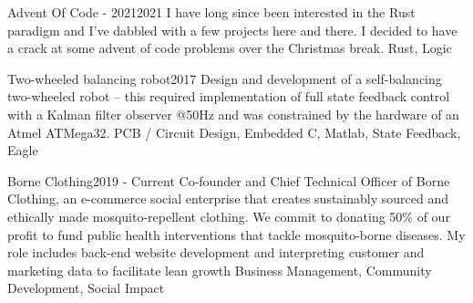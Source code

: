 %
%
%


\begin{projects}
	\project
	{Advent Of Code - 2021}{2021}
	{}
	{I have long since been interested in the Rust paradigm and I've dabbled with a few projects here and there. I decided to have a crack at some advent of code problems over the Christmas break.}
	{Rust, Logic}

	\project
	{Two-wheeled balancing robot}{2017}
	{}
	{Design and development of a self-balancing two-wheeled robot – this required
	implementation of full state feedback control with a Kalman filter observer @50Hz and was constrained by the
	hardware of an Atmel ATMega32.}
	{PCB / Circuit Design, Embedded C, Matlab, State Feedback, Eagle}

	\project
	{Borne Clothing}{2019 - Current}
	{}
	{Co-founder and Chief Technical Officer of Borne Clothing, an e-commerce social enterprise that creates sustainably sourced and ethically made mosquito-repellent clothing. We commit to donating 50\% of our profit to fund public health interventions that tackle mosquito-borne diseases. My role includes back-end website development and interpreting customer and marketing data to facilitate lean growth}
	{Business Management, Community Development, Social Impact}

\end{projects}